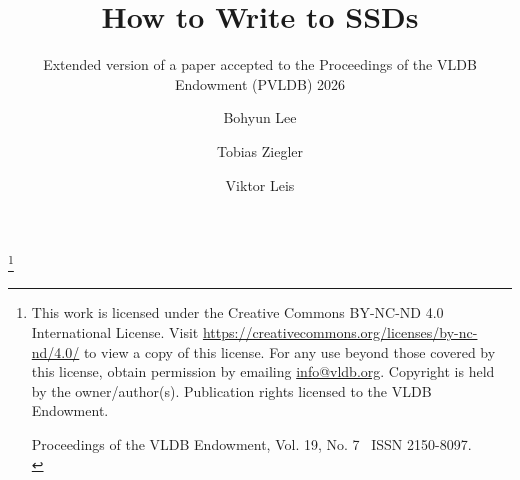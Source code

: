 \documentclass[sigconf, nonacm, prologue, table, xcdraw]{acmart}
\newcommand\vldbdoi{XX.XX/XXX.XX}
\newcommand\vldbpages{XXX-XXX}
\newcommand\vldbvolume{19}
\newcommand\vldbissue{7}
\newcommand\vldbyear{2026}
\newcommand\vldbauthors{\authors}
\newcommand\vldbtitle{\shorttitle}
\newcommand\vldbpagestyle{empty}
\begin{document}
\pagestyle{plain}       %
{}
%

\title{How to Write to SSDs}
\subtitle{\large\color{gray}Extended version of a paper accepted to the Proceedings of the VLDB Endowment (PVLDB) 2026}
\author{Bohyun Lee}

\author{Tobias Ziegler}

\author{Viktor Leis}




\maketitle


\pagestyle{\vldbpagestyle}
\begingroup
\renewcommand\thefootnote{}\footnote{\noindent
This work is licensed under the Creative Commons BY-NC-ND 4.0 International License. Visit \url{https://creativecommons.org/licenses/by-nc-nd/4.0/} to view a copy of this license. For any use beyond those covered by this license, obtain permission by emailing \href{mailto:info@vldb.org}{info@vldb.org}. Copyright is held by the owner/author(s). Publication rights licensed to the VLDB Endowment. \\
\raggedright Proceedings of the VLDB Endowment, Vol. \vldbvolume, No. \vldbissue\ %
ISSN 2150-8097. \\
}\addtocounter{footnote}{-1}\endgroup
\end{document}
